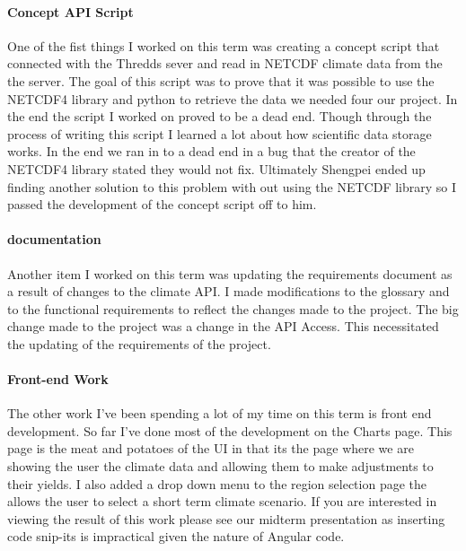 \documentclass[onecolumn, draftclsnofoot,10pt, compsoc]{article}
\begin{document}
		\paragraph{Concept API Script} \hfill \break
		One of the fist things I worked on this term was creating a concept script that connected with the Thredds sever and read in NETCDF climate data from the the server. The goal of this script was to prove that it was possible to use the NETCDF4 library and python to retrieve the data we needed four our project. In the end the script I worked on proved to be a dead end. Though through the process of writing this script I learned a lot about how scientific data storage works. In the end we ran in to a dead end in a bug that the creator of the NETCDF4 library stated they would not fix. Ultimately Shengpei ended up finding another solution to this problem with out using the NETCDF library so I passed the development of the concept script off to him.\\
		
		\paragraph{documentation} \hfill \break
		Another item I worked on this term was updating the requirements document as a result of changes to the climate API. I made modifications to the glossary and to the functional requirements to reflect the changes made to the project. The big change made to the project was a change in the API Access. This necessitated the updating of the requirements of the project.\\
		
		
		\paragraph{Front-end Work} \hfill \break
		The other work I've been spending a lot of my time on this term is front end development. So far I've done most of the development on the Charts page. This page is the meat and potatoes of the UI in that its the page where we are showing the user the climate data and allowing them to make adjustments to their yields. I also added a drop down menu to the region selection page the allows the user to select a short term climate scenario. If you are interested in viewing the result of this work please see our midterm presentation as inserting code snip-its is impractical given the nature of Angular code. 
			
\end{document}
